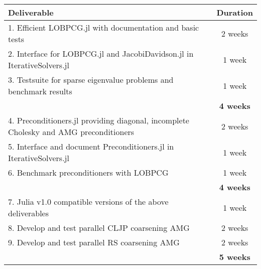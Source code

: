 \documentclass[12pt]{article}
\begin{document}
\begin{center}
 \begin{tabular}{||p{12cm} | c||}
 \hline
 \textbf{Deliverable} & \textbf{Duration} \\ [0.5ex] 
 \hline\hline
 1. Efficient LOBPCG.jl with documentation and basic tests & 2 weeks \\ 
 2. Interface for LOBPCG.jl and JacobiDavidson.jl in IterativeSolvers.jl & 1 week \\
 3. Testsuite for sparse eigenvalue problems and benchmark results & 1 week \\
 \hline
 \hline
  & \textbf{4 weeks} \\
 \hline
 \hline
 4. Preconditioners.jl providing diagonal, incomplete Cholesky and AMG preconditioners & 2 weeks \\
 5. Interface and document Preconditioners.jl in IterativeSolvers.jl & 1 week \\
 6. Benchmark preconditioners with LOBPCG & 1 week \\ [1ex] 
 \hline
 \hline
  & \textbf{4 weeks} \\
 \hline
 \hline
 7. Julia v1.0 compatible versions of the above deliverables & 1 week \\
 8. Develop and test parallel CLJP coarsening AMG & 2 weeks \\ 
 9. Develop and test parallel RS coarsening AMG & 2 weeks \\
 \hline
 \hline
  & \textbf{5 weeks} \\
 \hline
 \hline
\end{tabular}
\end{center}



\def\bibfont{\footnotesize}
\renewcommand{\bibsection}{\section{\bibname} \label{References}}


\end{document}

